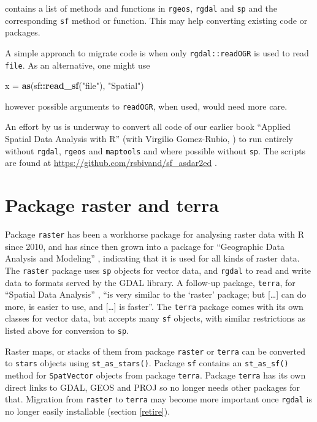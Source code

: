 \documentclass[]{book}
\newenvironment{Shaded}{\begin{snugshade}}{\end{snugshade}}
\newcommand{\KeywordTok}[1]{\textcolor[rgb]{0.13,0.29,0.53}{\textbf{#1}}}
\newcommand{\NormalTok}[1]{#1}
\newcommand{\OperatorTok}[1]{\textcolor[rgb]{0.81,0.36,0.00}{\textbf{#1}}}
\newcommand{\StringTok}[1]{\textcolor[rgb]{0.31,0.60,0.02}{#1}}
\begin{document}
contains a list of methods and functions in \texttt{rgeos}, \texttt{rgdal} and
\texttt{sp} and the corresponding \texttt{sf} method or function. This may help
converting existing code or packages.

A simple approach to migrate code is when only \texttt{rgdal::readOGR} is
used to read \texttt{file}. As an alternative, one might use

\begin{Shaded}
\begin{Highlighting}[]
\NormalTok{x =}\StringTok{ }\KeywordTok{as}\NormalTok{(sf}\OperatorTok{::}\KeywordTok{read_sf}\NormalTok{(}\StringTok{"file"}\NormalTok{), }\StringTok{"Spatial"}\NormalTok{)}
\end{Highlighting}
\end{Shaded}

however possible arguments to \texttt{readOGR}, when used, would need more
care.

An effort by us is underway to convert all code of our earlier book
``Applied Spatial Data Analysis with R'' (with Virgilio Gomez-Rubio,
\citet{asdar}) to run entirely without \texttt{rgdal}, \texttt{rgeos} and \texttt{maptools} and
where possible without \texttt{sp}. The scripts are found at
\url{https://github.com/rsbivand/sf_asdar2ed} .

\hypertarget{package-raster-and-terra}{%
\section{Package raster and terra}\label{package-raster-and-terra}}

Package \texttt{raster} has been a workhorse package for analysing raster
data with R since 2010, and has since then grown into a package for
``Geographic Data Analysis and Modeling'' \citep{R-raster}, indicating that
it is used for all kinds of raster data. The \texttt{raster} package uses
\texttt{sp} objects for vector data, and \texttt{rgdal} to read and write data to
formats served by the GDAL library. A follow-up package, \texttt{terra},
for ``Spatial Data Analysis'' \citep{R-terra}, ``is very similar to the
`raster' package; but {[}\ldots{}{]} can do more, is easier to use, and
{[}\ldots{}{]} is faster''. The \texttt{terra} package comes with its own classes for
vector data, but accepts many \texttt{sf} objects, with similar restrictions
as listed above for conversion to \texttt{sp}.

Raster maps, or stacks of them from package \texttt{raster} or \texttt{terra}
can be converted to \texttt{stars} objects using \texttt{st\_as\_stars()}. Package
\texttt{sf} contains an \texttt{st\_as\_sf()} method for \texttt{SpatVector} objects from
package \texttt{terra}. Package \texttt{terra} has its own direct links to GDAL,
GEOS and PROJ so no longer needs other packages for that. Migration
from \texttt{raster} to \texttt{terra} may become more important once \texttt{rgdal}
is no longer easily installable (section \ref{retire}).
\end{document}

